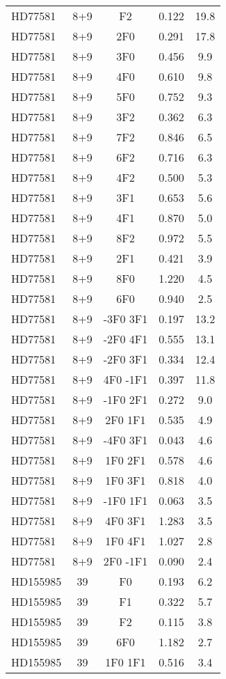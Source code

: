 \begin{table*}
\begin{tabular}{l c c c c}
HD77581 & 8+9 & F2 & 0.122 & 19.8\\ 
HD77581 & 8+9 & 2F0 & 0.291 & 17.8\\ 
HD77581 & 8+9 & 3F0 & 0.456 & 9.9\\ 
HD77581 & 8+9 & 4F0 & 0.610 & 9.8\\ 
HD77581 & 8+9 & 5F0 & 0.752 & 9.3\\ 
HD77581 & 8+9 & 3F2 & 0.362 & 6.3\\ 
HD77581 & 8+9 & 7F2 & 0.846 & 6.5\\ 
HD77581 & 8+9 & 6F2 & 0.716 & 6.3\\ 
HD77581 & 8+9 & 4F2 & 0.500 & 5.3\\ 
HD77581 & 8+9 & 3F1 & 0.653 & 5.6\\ 
HD77581 & 8+9 & 4F1 & 0.870 & 5.0\\ 
HD77581 & 8+9 & 8F2 & 0.972 & 5.5\\ 
HD77581 & 8+9 & 2F1 & 0.421 & 3.9\\ 
HD77581 & 8+9 & 8F0 & 1.220 & 4.5\\ 
HD77581 & 8+9 & 6F0 & 0.940 & 2.5\\ 
HD77581 & 8+9 & -3F0 3F1 & 0.197 & 13.2\\ 
HD77581 & 8+9 & -2F0 4F1 & 0.555 & 13.1\\ 
HD77581 & 8+9 & -2F0 3F1 & 0.334 & 12.4\\ 
HD77581 & 8+9 & 4F0 -1F1 & 0.397 & 11.8\\ 
HD77581 & 8+9 & -1F0 2F1 & 0.272 & 9.0\\ 
HD77581 & 8+9 & 2F0 1F1 & 0.535 & 4.9\\ 
HD77581 & 8+9 & -4F0 3F1 & 0.043 & 4.6\\ 
HD77581 & 8+9 & 1F0 2F1 & 0.578 & 4.6\\ 
HD77581 & 8+9 & 1F0 3F1 & 0.818 & 4.0\\ 
HD77581 & 8+9 & -1F0 1F1 & 0.063 & 3.5\\ 
HD77581 & 8+9 & 4F0 3F1 & 1.283 & 3.5\\ 
HD77581 & 8+9 & 1F0 4F1 & 1.027 & 2.8\\ 
HD77581 & 8+9 & 2F0 -1F1 & 0.090 & 2.4\\ 
\hline
HD155985 & 39 & F0 & 0.193 & 6.2\\ 
HD155985 & 39 & F1 & 0.322 & 5.7\\ 
HD155985 & 39 & F2 & 0.115 & 3.8\\ 
HD155985 & 39 & 6F0 & 1.182 & 2.7\\ 
HD155985 & 39 & 1F0 1F1 & 0.516 & 3.4\\ 

\end{tabular}
\end{table*}
